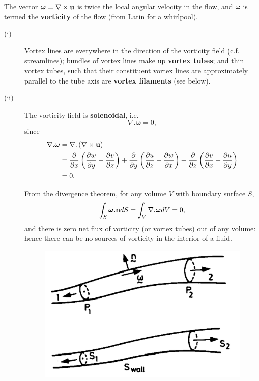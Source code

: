 \documentclass[twoside,a4paper,11pt]{report}
\begin{document}
The vector ${\bm{\omega}} =\nabla \times {{\bf u}}$ is twice the local angular 
velocity in the flow, and ${\bm \omega}$ is termed the 
\textbf{vorticity} of the flow (from Latin for a whirlpool).
\begin{description}
\item[(i)] Vortex lines are everywhere in the direction of the vorticity field (c.f. 
streamlines); bundles of vortex lines make up \textbf{vortex tubes}; and 
thin vortex tubes, such that their constituent vortex lines are 
approximately parallel to the tube axis are \textbf{vortex filaments} (see 
below).
\item[(ii)] The vorticity field is \textbf{solenoidal},  i.e. 
\[ \nabla . {\bm{\omega}} = 0,\]
since 
\begin{align*}
\nabla . {\bm{\omega}}
& =\nabla . \left( {\nabla \times {{\bf u}}} 
\right) \\
& =\frac{\partial }{\partial x}\left( {\frac{\partial w}{\partial 
y}-\frac{\partial v}{\partial z}} \right)+\frac{\partial }{\partial y}\left( 
{\frac{\partial u}{\partial z}-\frac{\partial w}{\partial x}} 
\right)+\frac{\partial }{\partial z}\left( {\frac{\partial v}{\partial 
x}-\frac{\partial u}{\partial y}} \right) \\
& = 0.
\end{align*}

From the divergence theorem, for any volume $V$ with boundary surface $S$,
\[
\int_S {{\bm{\omega}}. {{\bf n}}dS} =\int_V {\nabla . {\bm{\omega}} dV} 
=0,
\]
and there is zero net flux of vorticity (or vortex tubes) out of any volume: 
hence there can be no sources of vorticity in the interior of a fluid.

\begin{figure}[htbp]
\centerline{\includegraphics[width=4in]{Section42.pdf}}
\label{fig2}
\end{figure}


\end{description}
\end{document}
